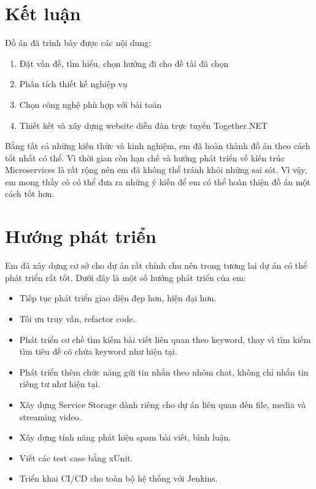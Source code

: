 \documentclass[../index.tex]{subfiles}
\begin{document}
    \section{Kết luận}
    Đồ án đã trình bày được các nội dung:
    \begin{enumerate}
       \item Đặt vấn đề, tìm hiểu, chọn hướng đi cho đề tài đã chọn
       \item Phân tích thiết kế nghiệp vụ
      \item Chọn công nghệ phù hợp với bài toán
        \item Thiết kết và xây dựng website diễn đàn trực tuyến Together.NET
    \end{enumerate}
    Bằng tất cả những kiến thức và kinh nghiệm, em đã hoàn thành đồ án theo cách tốt nhất có thể. Vì thời gian còn hạn chế và hướng phát triển về kiến trúc Microservices là rất rộng nên em đã không thể tránh khỏi những sai sót. Vì vậy, em mong thầy cô có thể đưa ra những ý kiến để em có thể hoàn thiện đồ
án một cách tốt hơn.
        

    \section{Hướng phát triển}
    Em đã xây dựng cơ sở cho dự án rất chỉnh chu nên trong tương lai dự án có thể phát triển rất tốt. Dưới đây là một số hướng phát triển của em:
    \begin{itemize}
        \item Tiếp tục phát triển giao diện đẹp hơn, hiện đại hơn.
        \item Tối ưu truy vấn, refactor code.
        \item Phát triển cơ chế tìm kiếm bài viết liên quan theo keyword, thay vì tìm kiếm tìm tiêu đề có chứa keyword như hiện tại.
        \item Phát triển thêm chức năng gửi tin nhắn theo nhóm chat, không chỉ nhắn tin riêng tư như hiện tại.
        \item Xây dựng Service Storage dành riêng cho dự án liên quan đến file, media và streaming video.
        \item Xây dựng tính năng phát hiện spam bài viết, bình luận.
        \item Viết các test case bằng xUnit. 
        \item Triển khai CI/CD cho toàn bộ hệ thống với Jenkins.
    \end{itemize}
    
\end{document}

